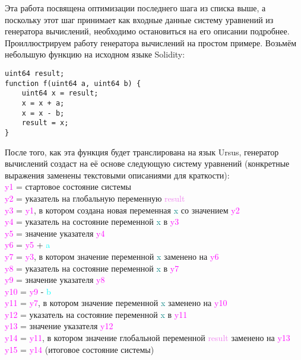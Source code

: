 \documentclass[../diploma.tex]{subfiles}
\begin{document}
Эта работа посвящена оптимизации последнего шага из списка выше, а поскольку этот шаг принимает как входные данные систему уравнений из генератора вычислений, необходимо остановиться на его описании подробнее. Проиллюстрируем работу генератора вычислений на простом примере. Возьмём небольшую функцию на исходном языке Solidity:

\begin{verbatim}
uint64 result;
function f(uint64 a, uint64 b) {
    uint64 x = result;
    x = x + a;
    x = x - b;
    result = x;
}
\end{verbatim}

После того, как эта функция будет транслирована на язык Ursus, генератор вычислений создаст на её основе следующую систему уравнений (конкретные выражения заменены текстовыми описаниями для краткости):
\bigskip\\
\newenvironment{allintypewriter}{\ttfamily}{}\begin{allintypewriter}\textcolor{magenta}{y1} = стартовое состояние системы\\
\textcolor{magenta}{y2} = указатель на глобальную переменную \textcolor{violet}{result}\\
\textcolor{magenta}{y3} = \textcolor{magenta}{y1}, в котором создана новая переменная \textcolor{teal}{x} со значением \textcolor{magenta}{y2}\\
\textcolor{magenta}{y4} = указатель на состояние переменной \textcolor{teal}{x} в \textcolor{magenta}{y3}\\
\textcolor{magenta}{y5} = значение указателя \textcolor{magenta}{y4}\\
\textcolor{magenta}{y6} = \textcolor{magenta}{y5} + \textcolor{cyan}{a}\\
\textcolor{magenta}{y7} = \textcolor{magenta}{y3}, в котором значение переменной \textcolor{teal}{x} заменено на \textcolor{magenta}{y6}\\
\textcolor{magenta}{y8} = указатель на состояние переменной \textcolor{teal}{x} в \textcolor{magenta}{y7}\\
\textcolor{magenta}{y9} = значение указателя \textcolor{magenta}{y8}\\
\textcolor{magenta}{y10} = \textcolor{magenta}{y9} - \textcolor{cyan}{b}\\
\textcolor{magenta}{y11} = \textcolor{magenta}{y7}, в котором значение переменной \textcolor{teal}{x} заменено на \textcolor{magenta}{y10}\\
\textcolor{magenta}{y12} = указатель на состояние переменной \textcolor{teal}{x} в \textcolor{magenta}{y11}\\
\textcolor{magenta}{y13} = значение указателя \textcolor{magenta}{y12}\\
\textcolor{magenta}{y14} = \textcolor{magenta}{y11}, в котором значение глобальной переменной \textcolor{violet}{result} заменено на \textcolor{magenta}{y13}\\
\textcolor{magenta}{y15} = \textcolor{magenta}{y14} (итоговое состояние системы)
\end{allintypewriter}
\bigskip
\end{document}
